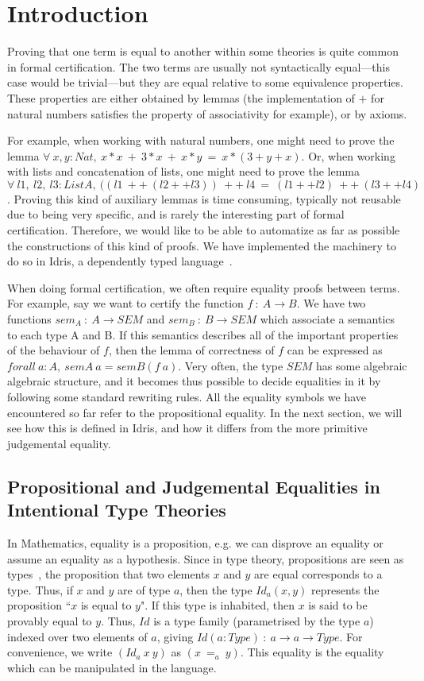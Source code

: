 \section{Introduction}

Proving that one term is equal to another within some theories is quite common
in formal certification. The two terms are usually not syntactically 
equal---this case would be trivial---but they are equal relative to some
equivalence properties. These properties are either obtained by lemmas
(the implementation of $+$ for natural numbers satisfies the property of
associativity for example), or by axioms.

For example, when working with natural numbers, one might need to prove the
lemma $\forall\ x, y:Nat,\ x*x\ +\ 3*x\ +\ x*y\ =\ x*(3+y+x)$. Or,
when working
with lists and concatenation of lists, one might need to prove the lemma
$\forall\ l1,\ l2,\ l3:List A,\ ((l1\ ++\ (l2 ++ l3))\ ++\ l4\ =\ (l1++l2)\ ++\
(l3++l4)$. Proving this kind of auxiliary lemmas is time consuming,
typically not reusable due to being very specific, and is rarely
the interesting part of formal
certification. Therefore, we would like to be able to automatize as far as
possible the constructions of this kind of proofs. We have implemented
the machinery to do so in Idris, a
dependently typed language~\cite{brady2013idris}.

When doing formal certification, we often require equality proofs between
terms.
For example, say we want to certify the function $f\ :\ A \rightarrow
B$. We have two functions $sem_A\ :\ A \rightarrow SEM$ and $sem_B\ : \ B
\rightarrow SEM$ which associate a semantics to each type A
and B. If this semantics describes all of the important properties of
the behaviour of $f$,
then the lemma of correctness of $f$ can be expressed as $forall\ a:A,\ semA\ a =
semB (f\ a)$. Very often, the type $SEM$ has some algebraic
algebraic structure, and it becomes thus possible to
decide equalities in it by following some standard rewriting rules.  
All the equality symbols we have
encountered so far refer to the propositional equality. In the next section,
we will see how this is defined in Idris, and how it differs from the more
primitive judgemental equality.

\subsection{Propositional and Judgemental Equalities in Intentional Type Theories}
In Mathematics, equality is a proposition, e.g. we can disprove an equality or 
assume an equality as a hypothesis.
Since in type theory, propositions are seen as types~\cite{How80}, the
proposition that two elements $x$ and $y$ are equal corresponds to a type.
Thus, if $x$ and $y$ are of type $a$, then the type
$Id_a(x, y)$ represents the proposition ``$x$ is equal to $y$". If this type is
inhabited, then $x$ is said to be provably equal to $y$.  Thus, $Id$ is a type
family (parametrised by the type $a$) indexed over two elements of $a$, giving
$Id (a:Type)\ :\ a \rightarrow a \rightarrow Type$. For
convenience, we write $(Id_a\ x\ y)$ as $(x\ =_a\ y)$. This equality is the
equality which can be manipulated in the language. 

